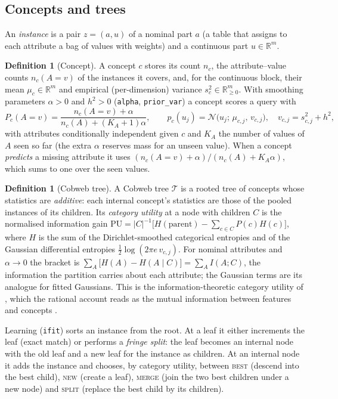 \documentclass[11pt]{article}
\theoremstyle{definition}
\newtheorem{definition}[theorem]{Definition}
\theoremstyle{remark}
\newcommand{\R}{\mathbb{R}}
\newcommand{\N}{\mathcal{N}}
\newcommand{\T}{\mathcal{T}}
\begin{document}
\subsection{Concepts and trees}

An \emph{instance} is a pair $z=(a,u)$ of a nominal part $a$ (a table that assigns to
each attribute a bag of values with weights) and a continuous part $u\in\R^m$.

\begin{definition}[Concept]\label{def:concept}
A concept $c$ stores its count $n_c$, the attribute--value counts $n_c(A{=}v)$ of the
instances it covers, and, for the continuous block, their mean $\mu_c\in\R^m$ and
empirical (per-dimension) variance $s_c^2\in\R^m_{\ge0}$.  With smoothing parameters
$\alpha>0$ and $h^2>0$ (\texttt{alpha}, \texttt{prior\_var}) a concept scores a query
with
\[
  P_c(A{=}v)=\frac{n_c(A{=}v)+\alpha}{n_c(A)+(K_A+1)\alpha},\qquad
  p_c(u_j)=\N\bigl(u_j;\,\mu_{c,j},\,v_{c,j}\bigr),\quad v_{c,j}=s^2_{c,j}+h^2,
\]
with attributes conditionally independent given $c$ and $K_A$ the number of values of $A$
seen so far (the extra $\alpha$ reserves mass for an unseen value).  When a concept
\emph{predicts} a missing attribute it uses $(n_c(A{=}v)+\alpha)/(n_c(A)+K_A\alpha)$,
which sums to one over the seen values.
\end{definition}

\begin{definition}[Cobweb tree]
A Cobweb tree $\T$ is a rooted tree of concepts whose statistics are \emph{additive}:
each internal concept's statistics are those of the pooled instances of its children.
Its \emph{category utility} at a node with children $C$ is the normalised information
gain $\mathrm{PU}=|C|^{-1}\bigl[H(\text{parent})-\sum_{c\in C}P(c)H(c)\bigr]$, where
$H$ is the sum of the Dirichlet-smoothed categorical entropies and of the Gaussian
differential entropies $\tfrac12\log(2\pi e\,v_{c,j})$.  For nominal attributes and
$\alpha\to0$ the bracket is $\sum_A\bigl[H(A)-H(A\mid C)\bigr]=\sum_AI(A;C)$, the
information the partition carries about each attribute; the Gaussian terms are its
analogue for fitted Gaussians.  This is the information-theoretic category utility of
\citet{corter1992}, which the rational account reads as the mutual information between
features and concepts \citep{maclellan2026rational}.
\end{definition}

Learning (\texttt{ifit}) sorts an instance from the root.  At a leaf it either
increments the leaf (exact match) or performs a \emph{fringe split}: the leaf becomes an
internal node with the old leaf and a new leaf for the instance as children.  At an
internal node it adds the instance and chooses, by category utility, between
\textsc{best} (descend into the best child), \textsc{new} (create a leaf),
\textsc{merge} (join the two best children under a new node) and \textsc{split}
(replace the best child by its children).
\end{document}
